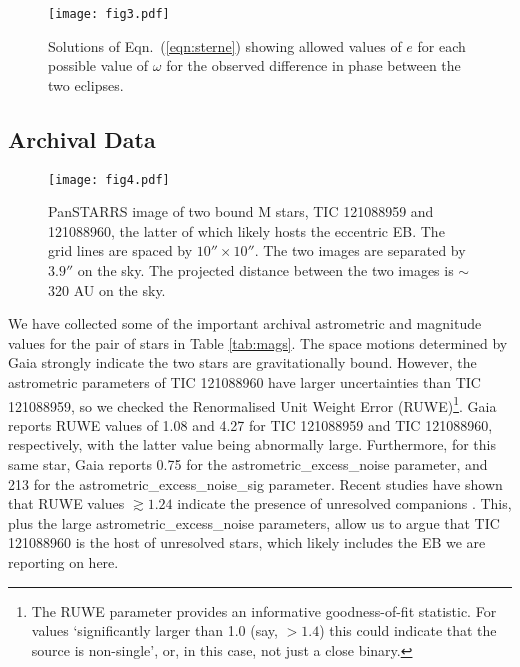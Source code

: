 \documentclass[fleqn,usenatbib]{mnras} %
\begin{document}
\begin{figure}
\texttt{[image: fig3.pdf]}
\caption{Solutions of Eqn.~(\ref{eqn:sterne}) showing allowed values of $e$ for each possible value of $\omega$ for the observed difference in phase between the two eclipses.}
\label{fig:e_P_contour}
\end{figure}

\subsection{Archival Data}
\label{sec:archival}

\begin{figure}
\null{}  \texttt{[image: fig4.pdf]}
\caption{PanSTARRS image of two bound M stars, TIC 121088959 and 121088960, the latter of which likely hosts the eccentric EB. The grid lines are spaced by $10'' \times 10''$.  The two images are separated by $3.9''$ on the sky.  The projected distance between the two images is $\sim$320 AU on the sky.}
\label{fig:PS_image}
\end{figure}

We have collected some of the important archival astrometric and magnitude values for the pair of stars in Table \ref{tab:mags}. The space motions determined by Gaia strongly indicate the two stars are gravitationally bound. However, the astrometric parameters of TIC 121088960 have larger uncertainties than TIC 121088959, so we checked the Renormalised Unit Weight Error (RUWE)\footnote{The RUWE parameter \citep{Lindegren2021a} provides an informative goodness-of-fit statistic. For values `significantly larger than 1.0 (say, $>1.4$) this could indicate that the source is non-single', or, in this case, not just a close binary.}. Gaia reports RUWE values of 1.08 and 4.27 for TIC 121088959 and TIC 121088960, respectively, with the latter value being abnormally large. Furthermore, for this same star, Gaia reports 0.75 for the astrometric\_excess\_noise parameter, and 213 for the astrometric\_excess\_noise\_sig parameter. Recent studies have shown that RUWE values $\gtrsim 1.24$ indicate the presence of unresolved companions \citep[e.g.][]{Rizzuto2018, Belokurov2020}. This, plus the large astrometric\_excess\_noise parameters, allow us to argue that TIC 121088960 is the host of unresolved stars, which likely includes the EB we are reporting on here.
\end{document}
